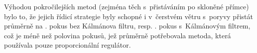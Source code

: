 Výhodou pokročilejších metod (zejména těch s~přistáváním po skloněné přímce) bylo to, že jejich řídicí strategie byly schopné i v~čerstvém větru s~poryvy přistát průměrně na \landingRetriesMeanLAPILvitrIV. pokus bez Kálmánova filtru, resp. \landingRetriesMeanKAPILvitrIV. pokus s~Kálmánovým filtrem, což je méně než polovina pokusů, jež průměrně potřebovala metoda, která používala pouze proporcionální regulátor.

